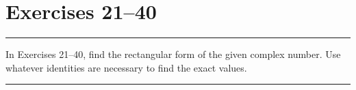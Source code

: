 \section{Exercises 21--40}

\hrule \medskip 

In Exercises 21--40, find the rectangular form of the given complex number. Use whatever identities are necessary to find the exact values. 

\medskip \hrule \medskip 